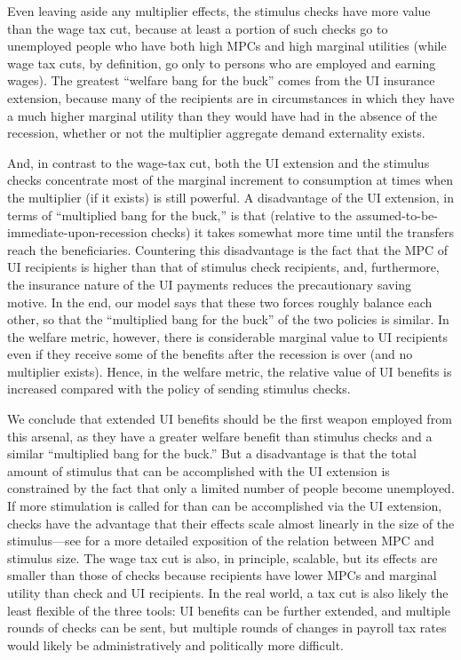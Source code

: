 \documentclass[\econtexRoot/HAFiscal]{subfiles}
\begin{document}
Even leaving aside any multiplier effects, the stimulus checks have more value than the wage tax cut, because at least a portion of such checks go to unemployed people who have both high MPCs and high marginal utilities (while wage tax cuts, by definition, go only to persons who are employed and earning wages). The greatest ``welfare bang for the buck'' comes from the UI insurance extension, because many of the recipients are in circumstances in which they have a much higher marginal utility than they would have had in the absence of the recession, whether or not the multiplier aggregate demand externality exists.

And, in contrast to the wage-tax cut, both the UI extension and the stimulus checks concentrate most of the marginal increment to consumption at times when the multiplier (if it exists) is still powerful.  A disadvantage of the UI extension, in terms of ``multiplied bang for the buck,'' is that (relative to the assumed-to-be-immediate-upon-recession checks) it takes somewhat more time until the transfers reach the beneficiaries. Countering this disadvantage is the fact that the MPC of UI recipients is higher than that of stimulus check recipients, and, furthermore, the insurance nature of the UI payments reduces the precautionary saving motive. In the end, our model says that these two forces roughly balance each other, so that the ``multiplied bang for the buck'' of the two policies is similar. In the welfare metric, however, there is considerable marginal value to UI recipients even if they receive some of the benefits after the recession is over (and no multiplier exists). Hence, in the welfare metric, the relative value of UI benefits is increased compared with the policy of sending stimulus checks.

We conclude that extended UI benefits should be the first weapon employed from this arsenal, as they have a greater welfare benefit than stimulus checks and a similar ``multiplied bang for the buck.'' But a disadvantage is that the total amount of stimulus that can be accomplished with the UI extension is constrained by the fact that only a limited number of people become unemployed.  If more stimulation is called for than can be accomplished via the UI extension, checks have the advantage that their effects scale almost linearly in the size of the stimulus---see \cite{beraja2023size} for a more detailed exposition of the relation between MPC and stimulus size.  The wage tax cut is also, in principle, scalable, but its effects are smaller than those of checks because recipients have lower MPCs and marginal utility than check and UI recipients.  In the real world, a tax cut is also likely the least flexible of the three tools:  UI benefits can be further extended, and multiple rounds of checks can be sent, but multiple rounds of changes in payroll tax rates would likely be administratively and politically more difficult.
\end{document}
